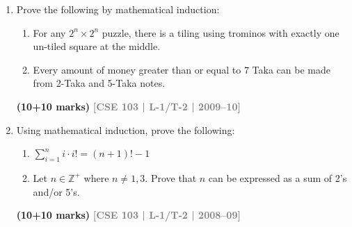 \documentclass[12pt,a3paper]{article}
\newcommand{\yr}[1]{\hfill\textcolor{gray}{\small\textbf{[#1]}}}
\newcommand{\mk}[1]{\textcolor{orange!70!black}{\small\textbf{(#1 marks)}}}
\begin{document}
\begin{enumerate}
\begin{tcolorbox}[breakable,colback=gray!5,colframe=gray!40,boxrule=0.5pt,arc=4pt,
  left=8pt,right=8pt,top=6pt,bottom=6pt]
\noindent
\textbf{Proof:} We prove the claim by induction. \\[0.2cm]
\textbf{Base step:} When $n = 1$, $(\ast)$ holds. \\[0.2cm]
\textbf{Induction step:} Let $k \in \mathbb{N}$ and suppose $(\ast)$ holds for $n = k$. Then
\begin{align*}
    \sum_{i=1}^{k+1} i &= \sum_{i=1}^{k} i + (k + 1) \\
    &= \frac{1}{2}\left(k + \frac{1}{2}\right)^2 + (k + 1) \quad \text{(by ind. Hypothesis)} \\
    &= \frac{1}{2}\left(k^2 + k + \frac{1}{4} + 2k + 2\right) \quad \text{(by algebra)} \\
    &= \frac{1}{2}\left[\left(k + 1 + \frac{1}{2}\right)^2 - 3k - \frac{9}{4} + k + \frac{1}{4} + 2k + 2\right] \quad \text{(more algebra)} \\
    &= \frac{1}{2}\left(k + 1 + \frac{1}{2}\right)^2 \quad \text{(simplifying)}
\end{align*}

\noindent
Thus, $(\ast)$ holds for $n = k + 1$, so the induction step is complete. \\[0.2cm]
\textbf{Conclusion:} By the principle of induction, $(\ast)$ holds for all $n \in \mathbb{N}$.
\end{tcolorbox}
\mk{6} \yr{CSE 103 | L-1/T-2 | 2009--10}

\item Prove the following by mathematical induction:
\begin{enumerate}
  \item For any $2^n \times 2^n$ puzzle, there is a tiling using trominos with exactly one un-tiled square at the middle.
  \item Every amount of money greater than or equal to 7 Taka can be made from 2-Taka and 5-Taka notes.
\end{enumerate}
\mk{10+10} \yr{CSE 103 | L-1/T-2 | 2009--10}



\item Using mathematical induction, prove the following:
\begin{enumerate}
  \item $\displaystyle\sum_{i=1}^{n} i \cdot i! = (n+1)! - 1$
  \item Let $n \in \mathbb{Z}^+$ where $n \neq 1, 3$. Prove that $n$ can be expressed as a sum of 2's and/or 5's.
\end{enumerate}
\mk{10+10} \yr{CSE 103 | L-1/T-2 | 2008--09}


\end{enumerate}
\end{document}
